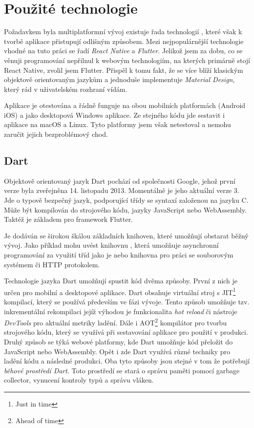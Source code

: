 \documentclass[
  biblatex,
  figures=true,
  tables=false,
  glossaries,
  index
]{kidiplom}
\begin{document}
\section{Použité technologie}

Požadavkem byla multiplatformní vývoj existuje řada technologií \cite{jetbrains-crossplatform}, které však k tvorbě aplikace přistupují odlišným způsobem. Mezi nejpopulárnější technologie vhodné na tuto práci se řadí \textit{React Native} a \textit{Flutter}. Jelikož jsem za dobu, co se věnuji programování nepřilnul k webovým technologiím, na kterých primárně stojí React Native, zvolil jsem Flutter. Přispěl k tomu fakt, že se více blíží klasickým objektově orientovaným jazykům a jednoduše implementuje \textit{Material Design}, který rád v uživatelském rozhraní vídám.

Aplikace je otestována a řádně funguje na obou mobilních platformách (Android iOS) a jako desktopová Windows aplikace. Ze stejného kódu jde sestavit i aplikace na macOS a Linux. Tyto platformy jsem však netestoval a nemohu zaručit jejich bezproblémový chod.

\subsection{Dart}
Objektově orientovaný jazyk Dart \cite{dart} pochází od společnosti Google, jehož první verze byla zveřejněna 14. listopadu 2013. Momentálně je jeho aktuální verze 3. Jde o typově bezpečný jazyk, podporující třídy se syntaxí založenou na jazyku C. Může být kompilován do strojového kódu, jazyky JavaScript nebo WebAssembly. Taktéž je základem pro framework Flutter.

\kiinlinecode{}{;}
Je dodáván se širokou škálou základních knihoven, které umožňují obstarat běžný vývoj. Jako příklad mohu uvést knihovnu , která umožňuje asynchronní programování za využití tříd jako je  nebo knihovna  pro práci se souborovým systémem či HTTP protokolem.

Technologie jazyka Dart umožňují spustit kód dvěma způsoby. První z nich je určen pro mobilní a desktopové aplikace. Dart obsahuje virtuální stroj s JIT\footnote{Just in time} kompilací, který se používá především ve fázi vývoje. Tento způsob umožňuje tzv. inkrementální rekompilaci jejíž výhodou je funkcionalita \textit{hot reload} či nástroje \textit{DevTools} pro aktuální metriky ladění. Dále i AOT\footnote{Ahead of time} kompilátor pro tvorbu strojového kódu, který se využívá při sestavování aplikace pro použití v produkci. Druhý způsob se týká webové platformy, kde Dart umožňuje kód přeložit do JavaScript nebo WebAssembly. Opět i zde Dart využívá různé techniky pro ladění kódu a následné produkci. Oba tyto způsoby jsou stejné v tom že potřebují \textit{běhové prostředí Dart}. Toto prostředí se stará o správu paměti pomocí garbage collector, vynucení kontroly typů a správu vláken.
\end{document}
